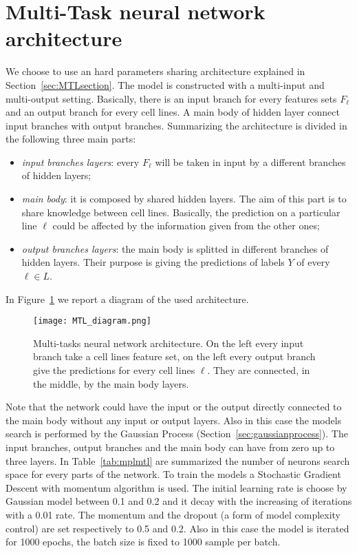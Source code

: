 \section{Multi-Task neural network architecture} \label{sec:mtlmlp}
We choose to use an hard parameters sharing architecture explained in Section~\ref{sec:MTLsection}. The model is constructed with a multi-input and multi-output setting. Basically, there is an input branch for every features sets $F_\ell$ and an output branch for every cell lines. A main body of hidden layer connect input branches with output branches. Summarizing the architecture is divided in the following three main parts:
\begin{itemize}
    \item \textit{input branches layers}: every $F_\ell$ will be taken in input by a different branches of hidden layers; 
    \item \textit{main body}: it is composed by shared hidden layers. The aim of this part is to share knowledge between cell lines. Basically, the prediction on a particular line $\ell$ could be affected by the information given from the other ones;
    \item \textit{output branches layers}: the main body is splitted in different branches of hidden layers. Their purpose is giving the predictions of labels $Y$ of every $\ell \in L$.
\end{itemize}
In Figure~\ref{fig:MTL_arch_diagram} we report a diagram of the used architecture.
\begin{figure}[ht]
\centering
\texttt{[image: MTL\_diagram.png]}
\caption{Multi-tasks neural network architecture. On the left every input branch take a cell lines feature set, on the left every output branch give the predictions for every cell lines $\ell$. They are connected, in the middle, by the main body layers. } 
\label{fig:MTL_arch_diagram}
\end{figure}
Note that the network could have the input or the output directly connected to the main body without any input or output layers. 
Also in this case the models search is performed by the Gaussian Process
(Section~\ref{sec:gaussianprocess}). The input branches, output branches and
the main body can have from zero up to three layers. In Table~\ref{tab:mplmtl} are summarized the number of neurons search space for every parts of the network. 
To train the models a Stochastic Gradient Descent with momentum algorithm is used. The initial learning rate is choose by Gaussian model between 0.1 and 0.2 and it decay with the increasing of iterations with a 0.01 rate. The momentum and the dropout (a form of model complexity control) are set respectively to 0.5 and 0.2. Also in this case the model is iterated for 1000 epochs, the batch size is fixed to 1000 sample per batch. 
